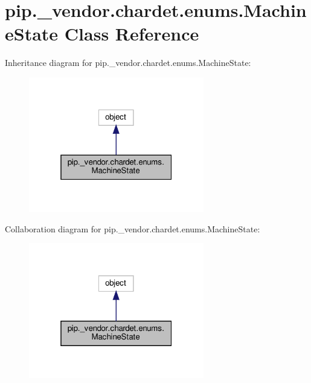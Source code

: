 \hypertarget{classpip_1_1__vendor_1_1chardet_1_1enums_1_1MachineState}{}\section{pip.\+\_\+vendor.\+chardet.\+enums.\+Machine\+State Class Reference}
\label{classpip_1_1__vendor_1_1chardet_1_1enums_1_1MachineState}


Inheritance diagram for pip.\+\_\+vendor.\+chardet.\+enums.\+Machine\+State\+:
\nopagebreak
\begin{figure}[H]
\begin{center}
\leavevmode
\includegraphics[width=217pt]{classpip_1_1__vendor_1_1chardet_1_1enums_1_1MachineState__inherit__graph}
\end{center}
\end{figure}


Collaboration diagram for pip.\+\_\+vendor.\+chardet.\+enums.\+Machine\+State\+:
\nopagebreak
\begin{figure}[H]
\begin{center}
\leavevmode
\includegraphics[width=217pt]{classpip_1_1__vendor_1_1chardet_1_1enums_1_1MachineState__coll__graph}
\end{center}
\end{figure}
